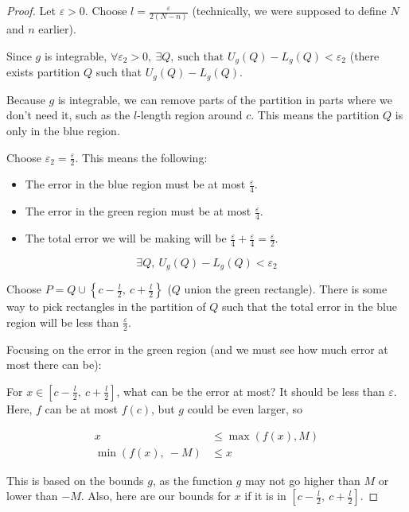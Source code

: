 \documentclass[12pt]{article}
\theoremstyle{plain}
\theoremstyle{remark}
\theoremstyle{definition}
\begin{document}
\begin{proof} Let \(\varepsilon > 0\). Choose
\(l = \frac{\varepsilon}{2(N - n)}\) (technically, we were supposed to
define \(N\) and \(n\) earlier).

Since \(g\) is integrable,
\(\forall\varepsilon_{2} > 0,\ \exists Q,\ \text{such\ that\ }U_{g}(Q) - L_{g}(Q) < \varepsilon_{2}\)
(there exists partition \(Q\) such that \(U_{g}(Q) - L_{g}(Q)\).

Because \(g\) is integrable, we can remove parts of the partition in
parts where we don't need it, such as the \(l\)-length region around
\(c\). This means the partition \(Q\) is only in the blue region.

Choose \(\varepsilon_{2} = \frac{\varepsilon}{2}\). This means the
following:

\begin{itemize}
\item
  The error in the blue region must be at most
  \(\frac{\varepsilon}{4}\).
\item
  The error in the green region must be at most
  \(\frac{\varepsilon}{4}\).
\item
  The total error we will be making will be
  \(\frac{\varepsilon}{4} + \frac{\varepsilon}{4} = \frac{\varepsilon}{2}\).
\end{itemize}

\[\exists Q,\ U_{g}(Q) - L_{g}(Q) < \varepsilon_{2}\]

Choose \(P = Q \cup \left\{ c - \frac{l}{2},\ c + \frac{l}{2} \right\}\)
(\(Q\) union the green rectangle). There is some way to pick rectangles
in the partition of \(Q\) such that the total error in the blue region
will be less than \(\frac{\varepsilon}{2}\).

Focusing on the error in the green region (and we must see how much
error at most there can be):

For
\(x \in \left\lbrack c - \frac{l}{2},\ c + \frac{l}{2} \right\rbrack\),
what can be the error at most? It should be less than \(\varepsilon\).
Here, \(f\) can be at most \(f(c)\), but \(g\) could be even larger, so

\begin{align*}
x &\leq \max\left( f(x),M \right) \\
\min\left( f(x),\  - M \right) &\leq x
\end{align*}


This is based on the bounds \(g\), as the function \(g\) may not go
higher than \(M\) or lower than \(- M\). Also, here are our bounds for
\(x\) if it is in
\(\left\lbrack c - \frac{l}{2},\ c + \frac{l}{2} \right\rbrack\).


\end{proof}
\end{document}
